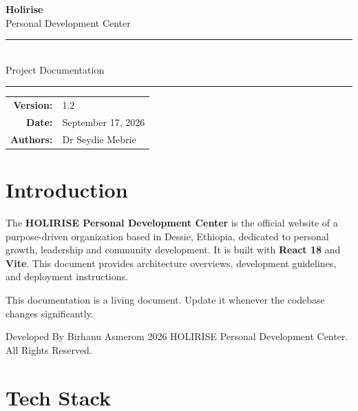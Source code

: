 \documentclass[11pt,a4paper]{article}
\begin{document}
\begin{titlepage}
\centering
\vspace*{2cm}

{\Huge\bfseries\color{primary} Holirise}\\[0.4cm]
{\LARGE\color{accent} Personal Development Center}\\[1.2cm]

\rule{\textwidth}{1pt}\\[0.5cm]
{\Large Project Documentation}\\[0.3cm]
\rule{\textwidth}{1pt}

\vfill

{\large\color{gray}
\begin{tabular}{rl}
\textbf{Version:} & 1.2 \\
\textbf{Date:}    & September 17, 2026 \\
\textbf{Authors:} & Dr Seydie Mebrie \\
\end{tabular}
}

\vspace{1cm}
\end{titlepage}

\tableofcontents
\newpage

\section{Introduction}

The \textbf{HOLIRISE Personal Development Center} is the official
website of a purpose-driven organization based in Dessie, Ethiopia,
dedicated to personal growth, leadership and community development.
It is built with \textbf{React 18} and \textbf{Vite}.  This document
provides architecture overviews, development guidelines, and
deployment instructions.

\begin{notebox}
This documentation is a living document.  Update it whenever the
codebase changes significantly.
\end{notebox}

\begin{warnbox}[Copyright]
Developed By Birhanu Asmerom \textcopyright{} 2026 HOLIRISE Personal
Development Center. All Rights Reserved.
\end{warnbox}

\section{Tech Stack}
\end{document}
